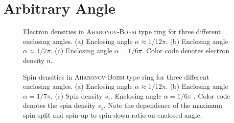 \chapter{Arbitrary Angle}\label{app:rings}
\begin{figure}[h!]
\caption{Electron densities in \textsc{Aharonov-Bohm} type ring for three different enclosing angles. (a) Enclosing angle $\alpha\approx 1/12 \pi$. (b) Enclosing angle $\alpha\approx 1/7\pi$. (c) Enclosing angle $\alpha=1/6\pi$. Color code denotes electron density $n$.} 
\end{figure}
\begin{figure}[h!]
\caption{Spin densities in \textsc{Aharonov-Bohm} type ring for three different enclosing angles. (a) Enclosing angle $\alpha\approx 1/12 \pi$. (b) Enclosing angle $\alpha=1/7\pi$. (c) Spin density $s_z$. Enclosing angle $\alpha=1/6\pi$ . Color code denotes the spin density $s_z$. Note the dependence of the maximum spin split and spin-up to spin-down ratio on enclosed angle.}
\end{figure}
